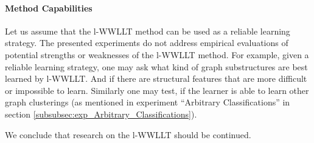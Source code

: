    	\paragraph{Method Capabilities}   	
   	Let us assume that the l-WWLLT method can be used as a reliable learning strategy.
   	The presented experiments do not address empirical evaluations of potential strengths or weaknesses of the l-WWLLT method.
   	For example, given a reliable learning strategy, one may ask what kind of graph substructures are best learned by l-WWLLT.
   	And if there are structural features that are more difficult or impossible to learn.   	
   	Similarly one may test, if the learner is able to learn other graph clusterings (as mentioned in experiment \enquote{Arbitrary Classifications} in section \ref{subsubsec:exp_Arbitrary_Classifications}).\newline
   	
   	We conclude that research on the l-WWLLT should be continued.